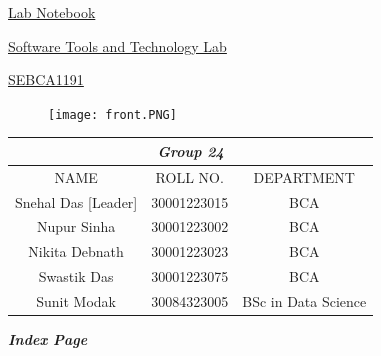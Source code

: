 \documentclass{article}
\renewcommand\arraystretch{2} %
\begin{document}
\begin{center}
    \Huge \underline{Lab Notebook}
\end{center}
    \vspace{1em}

    \begin{center}
    {\Large
    \underline{Software Tools and Technology Lab}} 
    \end{center}

    \vspace{0.4em}
    
    \begin{center}
        {\Large \underline{SEBCA1191}}
    \end{center}




\begin{figure}[h]
    \centering
    \texttt{[image: front.PNG]}
    
    \end{figure}

\vspace{1cm}

\begin{center}
    
\setlength{\arrayrulewidth}{0.4mm}
\setlength{\tabcolsep}{20pt}
\renewcommand{\arraystretch}{2}
\begin{tabular}{ |c|c|c| }
\hline
\multicolumn{3}{|c|}{\Large \textbf{\textit{Group 24}}} \\
\hline
NAME & ROLL NO.& DEPARTMENT \\
\hline
Snehal Das [Leader] & 30001223015 & BCA \\
Nupur Sinha & 30001223002 & BCA \\
Nikita Debnath & 30001223023 & BCA \\
Swastik Das & 30001223075 & BCA \\
Sunit Modak & 30084323005 & BSc in Data Science \\

\hline
\end{tabular}
\end{center}

\newpage

\begin{center}
    \Huge{\textit{\textbf{Index Page}}}

\vspace{1.1cm}
\end{center}
\end{document}
